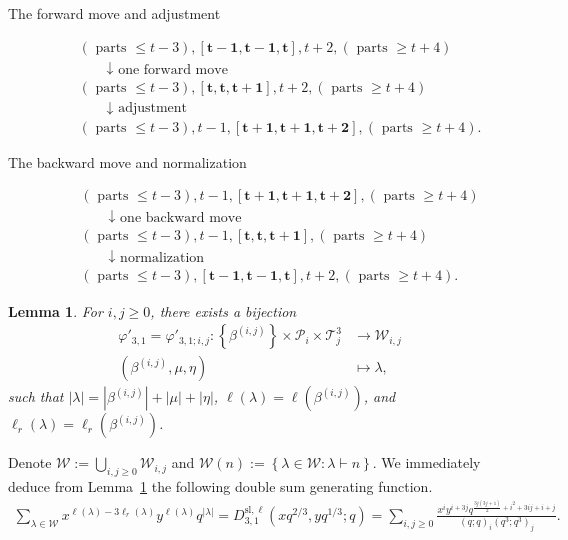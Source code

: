 \documentclass[11pt,reqno]{amsart}
\numberwithin{equation}{section}
\theoremstyle{plain}
\newtheorem{lemma}[theorem]{Lemma}
\theoremstyle{definition}
\newcommand{\abs}[1]{\left|#1\right|}
\newcommand{\set}[1]{\left\{#1\right\}}
\def\sl{\mathrm{sl}}
\def\la{\lambda}
\def\T{\mathcal{T}}
\renewcommand{\P}{\mathcal{P}}
\newcommand{\W}{\mathcal{W}}
\begin{document}
\begin{description}
\item[The forward move and adjustment]
$$
\begin{gathered}
(\text { parts } \leq t-3),[ \mathbf{t-1}, \mathbf{t-1}, \mathbf{t}], t+2, (\text { parts } \geq t+4) \\
\qquad \downarrow \text { one forward move } \\
(\text { parts } \leq t-3),[\mathbf{t}, \mathbf{t}, \mathbf{t+1}], t+2, (\text { parts } \geq t+4)\\
\qquad \downarrow \text { adjustment } \\
(\text { parts } \leq t-3), t-1, [\mathbf{t+1}, \mathbf{t+1}, \mathbf{t+2}], (\text { parts } \geq t+4).
\end{gathered}
$$

\item[The backward move and normalization]
$$
\begin{gathered}
(\text { parts } \leq t-3), t-1, [ \mathbf{t+1}, \mathbf{t+1}, \mathbf{t+2}], (\text { parts } \geq t+4) \\
\qquad \downarrow \text { one backward move } \\
(\text { parts } \leq t-3), t-1, [\mathbf{t}, \mathbf{t}, \mathbf{t+1}], (\text { parts } \geq t+4)\\
\qquad \downarrow \text { normalization } \\
(\text { parts } \leq t-3), [\mathbf{t-1}, \mathbf{t-1}, \mathbf{t}], t+2, (\text { parts } \geq t+4).
\end{gathered}
$$
\end{description}
 
\begin{lemma}\label{lem:inva of main}
For $i, j\geq 0$, there exists a bijection 
\begin{align*}
\varphi'_{3,1}=\varphi'_{3,1;i,j}: \set{\beta^{(i,j)}}\times\P_i\times\T^3_j &\to \W_{i,j}\\
(\beta^{(i,j)},\mu,\eta) &\mapsto \la,
\end{align*}
such that $|\la|=|\beta^{(i,j)}|+|\mu|+|\eta|$, $\ell(\la)=\ell(\beta^{(i,j)})$, and $\ell_r(\la)=\ell_r(\beta^{(i,j)})$.
\end{lemma} 

Denote $\W:=\bigcup_{i,j\ge 0}\W_{i,j}$ and $\W(n):=\set{\la\in\W: \la\vdash n}$. We immediately deduce from Lemma~\ref{lem:inva of main} the following double sum generating function.
\begin{align}\label{gf:W-xy}
\sum_{\la\in\W}x^{\ell(\la)-3\ell_r(\la)}y^{\ell(\la)}q^{\abs{\la}}=D_{3,1}^{\sl,\ell}(xq^{2/3},yq^{1/3};q)=\sum_{i,j\ge 0}\frac{x^{i}y^{i+3j}q^{\frac{3j(3j+1)}{2}+i^2+3ij+i+j}}{(q;q)_i(q^3;q^3)_j}.
\end{align}
\end{document}
